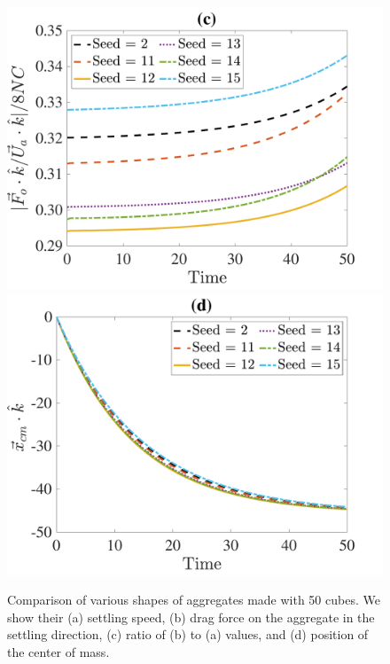 \begin{figure}[ht]
\begin{center}
		\includegraphics[scale=0.29]{./figures/fig_NC50_sd_Fo3Ua_ratio}
		\includegraphics[scale=0.29]{./figures/fig_NC50_sd_cm3_all}
	\caption{Comparison of various shapes of aggregates made with 50 cubes. We show their (a) settling speed, (b) drag force on the aggregate in the settling direction, (c) ratio of (b) to (a) values, and (d) position of the center of mass.}
	\label{fig_NC50_Seeds}
\end{center}
\end{figure}
\par
